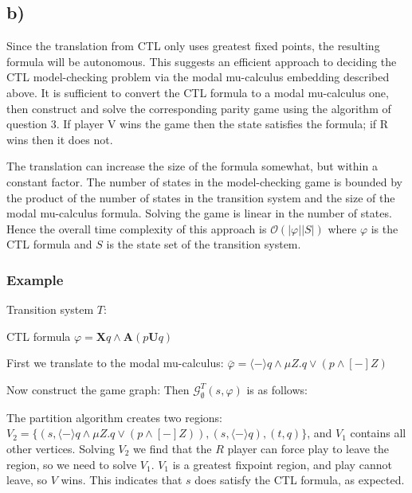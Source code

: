 \documentclass[11pt]{article}
\begin{document}
\subsection*{b)}

Since the translation from CTL only uses greatest fixed points, the resulting
formula will be autonomous. This suggests an efficient approach to deciding the
CTL model-checking problem via the modal mu-calculus embedding described above.
It is sufficient to convert the CTL formula to a modal mu-calculus one, then
construct and solve the corresponding parity game using the algorithm of
question 3. If player V wins the game then the state satisfies the formula; if
R wins then it does not.

The translation can increase the size of the formula somewhat, but within a
constant factor. The number of states in the model-checking game is bounded by
the product of the number of states in the transition system and the size of
the modal mu-calculus formula. Solving the game is linear in the number of
states. Hence the overall time complexity of this approach is
$\mathcal{O}(|\varphi||S|)$ where $\varphi$ is the CTL formula and $S$ is the state
set of the transition system.

\subsubsection*{Example}

Transition system $T$:


CTL formula $\varphi = \textbf{X}q \wedge \textbf{A}(p\textbf{U}q)$

First we translate to the modal mu-calculus:
$\bar{\varphi} = \langle - \rangle q \wedge \mu Z . q \vee (p \wedge [-]Z)$

Now construct the game graph:
Then $\mathcal{G}^{T}_{\emptyset}(s, \varphi)$ is as follows:


The partition algorithm creates two regions: $V_2 = \{ (s, \langle - \rangle q \wedge \mu Z . q \vee (p \wedge [-]Z)), (s,  \langle - \rangle q ), (t, q) \}$, and $V_1$ contains all other vertices.
Solving $V_2$ we find that the $R$ player can force play to leave the region,
so we need to solve $V_1$. $V_1$ is a greatest fixpoint region, and play cannot
leave, so $V$ wins. This indicates that $s$ does satisfy the CTL formula, as
expected.
\end{document}
